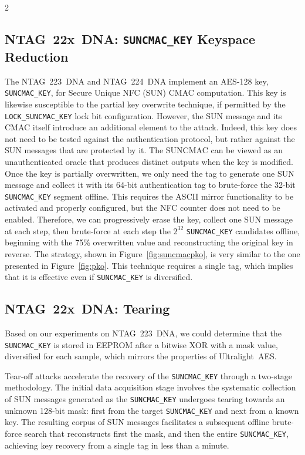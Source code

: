 \documentclass[10pt,letterpaper]{article}
\begin{document}
\begin{multicols}{2}
\subsection{NTAG~22x~DNA: \texttt{SUNCMAC\_KEY} Keyspace Reduction}
The NTAG~223~DNA and NTAG~224~DNA implement an AES-128 key, \texttt{SUNCMAC\_KEY}, for Secure Unique NFC (SUN) CMAC computation. This key is likewise susceptible to the partial key overwrite technique, if permitted by the \texttt{LOCK\_SUNCMAC\_KEY} lock bit configuration.
However, the SUN message and its CMAC itself introduce an additional element to the attack. Indeed, this key does not need to be tested against the authentication protocol, but rather against the SUN messages that are protected by it. The SUNCMAC can be viewed as an unauthenticated oracle that produces distinct outputs when the key is modified. Once the key is partially overwritten, we only need the tag to generate one SUN message and collect it with its 64-bit authentication tag to brute-force the 32-bit \texttt{SUNCMAC\_KEY} segment offline. This requires the ASCII mirror functionality to be activated and properly configured, but the NFC counter does not need to be enabled.
Therefore, we can progressively erase the key, collect one SUN message at each step, then brute-force at each step the $2^{32}$ \texttt{SUNCMAC\_KEY} candidates offline, beginning with the 75\% overwritten value and reconstructing the original key in reverse. The strategy, shown in Figure~\ref{fig:suncmacpko}, is very similar to the one presented in Figure~\ref{fig:pko}. This technique requires a single tag, which implies that it is effective even if \texttt{SUNCMAC\_KEY} is diversified.

\subsection{NTAG~22x~DNA: Tearing}
\label{sec:ntag22x_tear}

Based on our experiments on NTAG~223~DNA, we could determine that the \texttt{SUNCMAC\_KEY} is stored in EEPROM after a bitwise XOR with a mask value, diversified for each sample, which mirrors the properties of Ultralight~AES.

Tear-off attacks accelerate the recovery of the \texttt{SUNCMAC\_KEY} through a two-stage methodology. The initial data acquisition stage involves the systematic collection of SUN messages generated as the \texttt{SUNCMAC\_KEY} undergoes tearing towards an unknown 128-bit mask: first from the target \texttt{SUNCMAC\_KEY} and next from a known key. The resulting corpus of SUN messages facilitates a subsequent offline brute-force search that reconstructs first the mask, and then the entire \texttt{SUNCMAC\_KEY}, achieving key recovery from a single tag in less than a minute.


\end{multicols}
\end{document}
